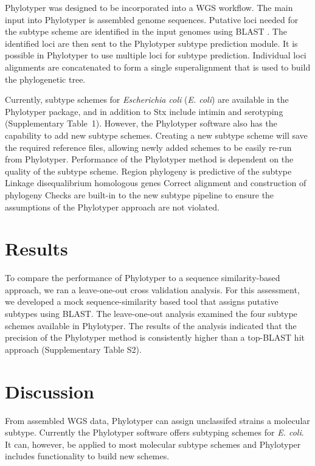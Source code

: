 \documentclass{bioinfo}
\begin{document}
Phylotyper was designed to be incorporated into a WGS workflow.  
The main input into Phylotyper is assembled genome sequences.  
Putative loci needed for the subtype scheme are identified in the input genomes using BLAST \citep{Camacho2009}.
The identified loci are then sent to the Phylotyper subtype prediction module.
It is possible in Phylotyper to use multiple loci for subtype prediction.
Individual loci alignments are concatenated to form a single superalignment that is used to build the phylogenetic tree.

Currently, subtype schemes for \emph{Escherichia coli} (\textit{E. coli}) are available in the Phylotyper package, and in addition to Stx include intimin and serotyping  (Supplementary Table~1).
However, the Phylotyper software also has the capability to add new subtype schemes. 
Creating a new subtype scheme will save the required reference files, allowing newly added schemes to be easily re-run from Phylotyper.
Performance of the Phylotyper method is dependent on the quality of the subtype scheme.
Region phylogeny is predictive of the subtype
Linkage disequalibrium
homologous genes
Correct alignment and construction of phylogeny
Checks are built-in to the new subtype pipeline to ensure the assumptions of the Phylotyper approach are not violated.  

\section{Results}

To compare the performance of Phylotyper to a sequence similarity-based approach, we ran a leave-one-out cross validation analysis.
For this assessment, we developed a mock sequence-similarity based tool that assigns putative subtypes using BLAST.
The leave-one-out analysis examined the four subtype schemes available in Phylotyper. The results of the analysis indicated that the precision of the Phylotyper method is consistently higher than a top-BLAST hit approach (Supplementary Table S2).

\section{Discussion}

From assembled WGS data, Phylotyper can assign unclassifed strains a molecular subtype.
Currently the Phylotyper software offers subtyping schemes for \textit{E. coli}.
It can, however, be applied to most molecular subtype schemes and Phylotyper includes functionality to build new schemes.
\end{document}
